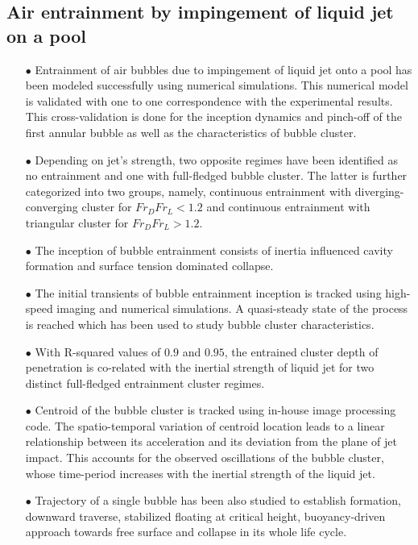\subsection{Air entrainment by impingement of liquid jet on a pool}
\begin{enumerate}
\item [$\bullet$] Entrainment of air bubbles due to impingement of liquid jet onto a pool has been modeled successfully using numerical simulations. This numerical model is validated with one to one correspondence with the experimental results. This cross-validation is done for the inception dynamics and pinch-off of the first annular bubble as well as the characteristics of bubble cluster. 
\item [$\bullet$] Depending on jet's strength, two opposite regimes have been identified as no entrainment and one with full-fledged bubble cluster. The latter is further categorized into two groups, namely, continuous entrainment with diverging-converging cluster for $Fr_DFr_L < 1.2$ and continuous entrainment with triangular cluster for $Fr_DFr_L > 1.2$.   
\item [$\bullet$] The inception of bubble entrainment consists of inertia influenced cavity formation and surface tension dominated collapse. 
\item [$\bullet$] The initial transients of bubble entrainment inception is tracked using high-speed imaging and numerical simulations. A quasi-steady state of the process is reached which has been used to study bubble cluster characteristics. 
\item [$\bullet$] With R-squared values of $0.9$ and $0.95$, the entrained cluster depth of penetration is co-related with the inertial strength of liquid jet for two distinct full-fledged entrainment cluster regimes.
\item [$\bullet$] Centroid of the bubble cluster is tracked using in-house image processing code. The spatio-temporal variation of centroid location leads to a linear relationship between its acceleration and its deviation from the plane of jet impact. This accounts for the observed oscillations of the bubble cluster, whose time-period increases with the inertial strength of the liquid jet. 
\item [$\bullet$] Trajectory of a single bubble has been also studied to establish formation, downward traverse, stabilized floating at critical height, buoyancy-driven approach towards free surface and collapse in its whole life cycle.
\end{enumerate}
